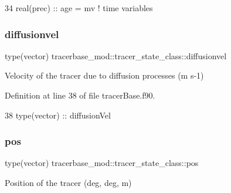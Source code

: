 \begin{DoxyCode}
34         \textcolor{keywordtype}{real(prec)} :: age = mv             \textcolor{comment}{! time variables}
\end{DoxyCode}
\mbox{\label{structtracerbase__mod_1_1tracer__state__class_a4b2ac1e1c805253de08569d9edcc06ab}} 
\subsubsection{\texorpdfstring{diffusionvel}{diffusionvel}}
{\footnotesize\ttfamily type(vector) tracerbase\+\_\+mod\+::tracer\+\_\+state\+\_\+class\+::diffusionvel\hspace{0.3cm}{\ttfamily [private]}}



Velocity of the tracer due to diffusion processes (m s-\/1) 



Definition at line 38 of file tracer\+Base.\+f90.


\begin{DoxyCode}
38         \textcolor{keywordtype}{type}(vector) :: diffusionVel
\end{DoxyCode}
\mbox{\label{structtracerbase__mod_1_1tracer__state__class_a184b3ecbe519a6cc7468fa3060131ce0}} 
\subsubsection{\texorpdfstring{pos}{pos}}
{\footnotesize\ttfamily type(vector) tracerbase\+\_\+mod\+::tracer\+\_\+state\+\_\+class\+::pos\hspace{0.3cm}{\ttfamily [private]}}



Position of the tracer (deg, deg, m) 




